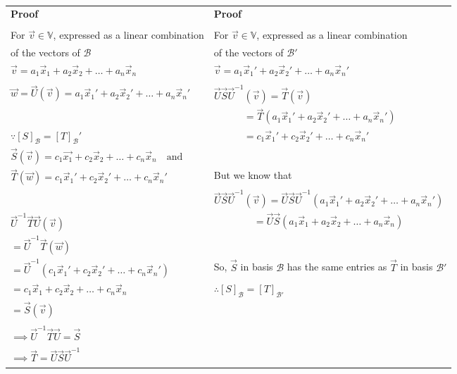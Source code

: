 \documentclass[journal,12pt,twocolumn]{IEEEtran}
\begin{document}
\begin{table*}[h!]
\begin{center}
\begin{tabular}{|l|l|}
\textbf{Proof}&\textbf{Proof}\\
 & \\
For $\vec{v} \in \mathbb V$, expressed as a linear combination &
For $\vec{v} \in \mathbb V$, expressed as a linear combination\\
of the vectors of $\mathcal{B}$ &
of the vectors of $\mathcal{B'}$\\
$\vec{v} = a_1\vec{x}_1 + a_2\vec{x}_2 + \ldots + a_n\vec{x}_n$ &
$\vec{v} = a_1\vec{x}_1' + a_2\vec{x}_2' + \ldots + a_n\vec{x}_n'$\\
 & \\
$\vec{w} = \vec{U}(\vec{v}) = a_1\vec{x}_1' + a_2\vec{x}_2' + \ldots + a_n\vec{x}_n'$ &
$\vec{U}\vec{S}\vec{U}^{-1}(\vec{v}) = \vec{T}(\vec{v})$\\
 & $\quad\quad\quad= \vec{T}(a_1\vec{x}_1' + a_2\vec{x}_2' + \ldots + a_n\vec{x}_n')$\\
$\because [S]_\mathcal{B} = [T]_\mathcal{B}'$ &
$\quad\quad\quad= c_1\vec{x}_1' + c_2\vec{x}_2' + \ldots + c_n\vec{x}_n'$\\
$\vec{S}(\vec{v}) = c_1\vec{x_1} + c_2\vec{x}_2 + \ldots + c_n\vec{x}_n\quad\text{and}$ & \\
$\vec{T}(\vec{w}) = c_1\vec{x}_1' + c_2\vec{x}_2' + \ldots + c_n\vec{x}_n'$ &
But we know that\\
 & $\vec{U}\vec{S}\vec{U}^{-1}(\vec{v}) = \vec{U}\vec{S}\vec{U}^{-1}(a_1\vec{x}_1' + a_2\vec{x}_2' + \ldots + a_n\vec{x}_n')$\\
$\vec{U}^{-1}\vec{T}\vec{U}(\vec{v})$ &
$\quad\quad\quad\quad= \vec{U}\vec{S}(a_1\vec{x}_1+a_2\vec{x}_2+\ldots+a_n\vec{x}_n)$\\
$=\vec{U}^{-1}\vec{T}(\vec{w})$ & \\
$=\vec{U}^{-1}(c_1\vec{x}_1' + c_2\vec{x}_2' + \ldots + c_n\vec{x}_n')$ &
So, $\vec{S}$ in basis $\mathcal{B}$ has the same entries as $\vec{T}$ in basis $\mathcal{B}'$\\
$= c_1\vec{x}_1 + c_2\vec{x}_2 + \ldots + c_n\vec{x}_n$ &
$\therefore [S]_\mathcal{B} = [T]_\mathcal{B'}$\\
$=\vec{S}(\vec{v})$ & \\
 & \\
$\implies\vec{U}^{-1}\vec{T}\vec{U} = \vec{S}$ & \\
$\implies \vec{T} = \vec{U}\vec{S}\vec{U}^{-1}$ & \\[0.5ex] \hline
\end{tabular}
\caption{}
\label{table:1}
\end{center}
\vspace{-0.5cm}
\end{table*}
\end{document}
